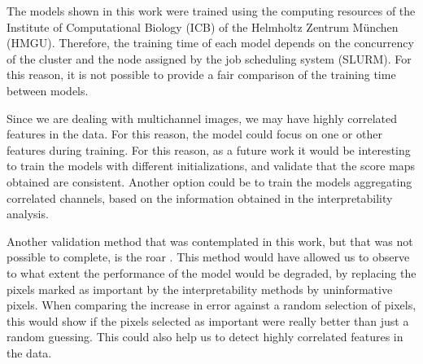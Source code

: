 
\glsresetall
\graphicspath{{./Sections/Results/Resources/}}

The models shown in this work were trained using the computing resources of the Institute of Computational Biology (ICB) of the Helmholtz Zentrum München (HMGU). Therefore, the training time of each model depends on the concurrency of the cluster and the node assigned by the job scheduling system (SLURM). For this reason, it is not possible to provide a fair comparison of the training time between models.

Since we are dealing with multichannel images, we may have highly correlated features in the data. For this reason, the model could focus on one or other features during training. For this reason, as a future work it would be interesting to train the models with different initializations, and validate that the score maps obtained are consistent. Another option could be to train the models aggregating correlated channels, based on the information obtained in the interpretability analysis.

Another validation method that was contemplated in this work, but that was not possible to complete, is the \gls{roar} \cite{hooker2018benchmark}. This method would have allowed us to observe to what extent the performance of the model would be degraded, by replacing the pixels marked as important by the interpretability methods by uninformative pixels. When comparing the increase in error against a random selection of pixels, this would show if the pixels selected as important were really better than just a random guessing. This could also help us to detect highly correlated features in the data.
